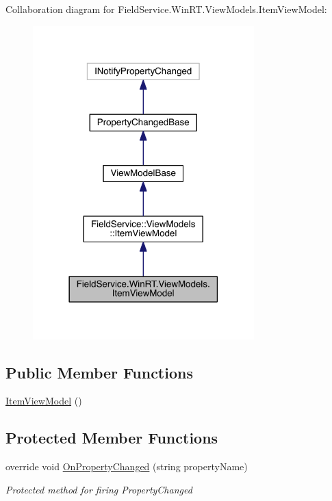 Collaboration diagram for Field\+Service.\+Win\+R\+T.\+View\+Models.\+Item\+View\+Model\+:
\nopagebreak
\begin{figure}[H]
\begin{center}
\leavevmode
\includegraphics[width=242pt]{class_field_service_1_1_win_r_t_1_1_view_models_1_1_item_view_model__coll__graph}
\end{center}
\end{figure}
\subsection*{Public Member Functions}
\begin{DoxyCompactItemize}
\item 
\hyperlink{class_field_service_1_1_win_r_t_1_1_view_models_1_1_item_view_model_ad3f93d06d7aead0eb7ce80f266916941}{Item\+View\+Model} ()
\end{DoxyCompactItemize}
\subsection*{Protected Member Functions}
\begin{DoxyCompactItemize}
\item 
override void \hyperlink{class_field_service_1_1_win_r_t_1_1_view_models_1_1_item_view_model_a04f564001759402cb74031112a33636d}{On\+Property\+Changed} (string property\+Name)
\begin{DoxyCompactList}\small\item\em Protected method for firing Property\+Changed \end{DoxyCompactList}\end{DoxyCompactItemize}
